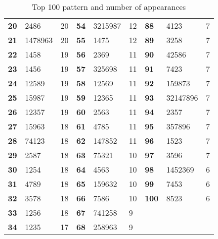 \begin{table}[H]
\begin{tabular}{l | l l | l | l l  | l | l l }
	      {\bf 20} & 2486       & 20  & {\bf 54} & 3215987  & 12 & {\bf 88} & 4123 & 7 \\ 
	      {\bf 21} & 1478963    & 20  & {\bf 55} & 1475     & 12 & {\bf 89} & 3258 & 7 \\ 
	      {\bf 22} & 1458       & 19  & {\bf 56} & 2369     & 11 & {\bf 90} & 42586 & 7 \\ 
	      {\bf 23} & 1456       & 19  & {\bf 57} & 325698   & 11 & {\bf 91} & 7423 & 7 \\ 
	      {\bf 24} & 12589      & 19  & {\bf 58} & 12569    & 11 & {\bf 92} & 159873 & 7 \\ 
	      {\bf 25} & 15987      & 19  & {\bf 59} & 12365    & 11 & {\bf 93} & 32147896 & 7 \\ 
	      {\bf 26} & 12357      & 19  & {\bf 60} & 2563     & 11 & {\bf 94} & 2357 & 7 \\ 
	      {\bf 27} & 15963      & 18  & {\bf 61} & 4785     & 11 & {\bf 95} & 357896 & 7 \\ 
	      {\bf 28} & 74123      & 18  & {\bf 62} & 147852   & 11 & {\bf 96} & 1523 & 7 \\ 
	      {\bf 29} & 2587       & 18  & {\bf 63} & 75321    & 10 & {\bf 97} & 3596 & 7 \\ 
	      {\bf 30} & 1254       & 18  & {\bf 64} & 4563     & 10 & {\bf 98} & 1452369 & 6 \\ 
	      {\bf 31} & 4789       & 18  & {\bf 65} & 159632   & 10 & {\bf 99} & 7453 & 6 \\ 
	      {\bf 32} & 3578       & 18  & {\bf 66} & 7586     & 10 & {\bf 100} & 8523 & 6 \\ 
	      {\bf 33} & 1256       & 18  & {\bf 67} & 741258   & 9  & & & \\ 
	      {\bf 34} & 1235       & 17  & {\bf 68} & 258963   & 9  & & & \\ \hline
	    \end{tabular} 
	    \caption{Top 100 pattern and number of appearances}
	    \label{tab:top100}
	  \end{table}



